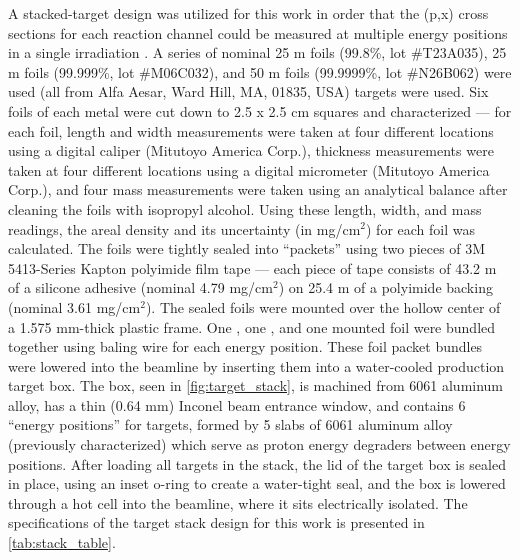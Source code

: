 A stacked-target design was utilized for this work in order that the (p,x) cross sections for each reaction channel could be measured at multiple energy positions in a single irradiation \cite{Cumming1963}. 
A series of nominal 25 \mmicro m  foils (99.8\%, lot \#T23A035), 25 \mmicro m  foils (99.999\%, lot \#M06C032), and 50 \mmicro m  foils (99.9999\%, lot \#N26B062) were used (all from Alfa Aesar, Ward Hill, MA, 01835, USA) targets were used.
Six foils of each metal were cut down to 2.5 x 2.5 cm squares and characterized --- for each foil, length and width measurements were taken at four different locations using a digital caliper (Mitutoyo America Corp.), thickness measurements were taken at four different locations using a digital micrometer (Mitutoyo America Corp.), and four mass measurements were taken using an analytical balance after cleaning the foils with isopropyl alcohol.
Using these length, width, and mass readings, the areal density and its uncertainty (in mg/cm$^2$) for each foil was calculated.
The foils were tightly sealed into \enquote{packets} using two pieces of  3M 5413-Series Kapton polyimide film tape --- each piece of tape consists of 43.2 \mmicro m of a silicone adhesive (nominal 4.79 mg/cm$^2$) on 25.4 \mmicro m of a polyimide backing (nominal 3.61 mg/cm$^2$).
The sealed foils were mounted over the hollow center of a 1.575 mm-thick plastic frame.
One , one , and one  mounted foil were bundled together using baling wire for each energy position.
These foil packet bundles were lowered into the beamline by inserting them into a  water-cooled production target box.
The box, seen in \autoref{fig:target_stack}, is machined from 6061 aluminum alloy, has a thin (0.64 mm) Inconel beam entrance window, and  contains 6 \enquote{energy positions} for targets, formed by  5 slabs of 6061 aluminum alloy (previously characterized) which serve as proton energy degraders  between energy positions.
After loading all targets in the stack, the lid of the target box is sealed in place, using an inset o-ring to create a water-tight seal, and the box is lowered through a hot cell into the beamline, where it sits electrically isolated.
The specifications of the target stack design for this work is presented in \autoref{tab:stack_table}.



